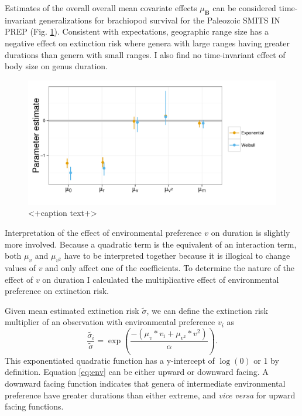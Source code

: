 \documentclass[12pt,letterpaper]{article}
\begin{document}
Estimates of the overall overall mean covariate effects \(\mu_{\mathbf{B}}\) can be considered time-invariant generalizations for brachiopod survival for the Paleozoic \uppercase{Smits in prep} (Fig. \ref{fig:mu}). Consistent with expectations, geographic range size has a negative effect on extinction risk where genera with large ranges having greater durations than genera with small ranges. I also find no time-invariant effect of body size on genus duration. 
\begin{figure}[ht]
  \centering
  \includegraphics[height = 0.5\textheight,width=\textwidth,keepaspectratio=true]{figure/coef_means}
  \caption{<+caption text+>}
  \label{fig:mu}
\end{figure}

Interpretation of the effect of environmental preference \(v\) on duration is slightly more involved. Because a quadratic term is the equivalent of an interaction term, both \(\mu_{v}\) and \(\mu_{v^{2}}\) have to be interpreted together because it is illogical to change values of \(v\) and only affect one of the coefficients. To determine the nature of the effect of \(v\) on duration I calculated the multiplicative effect of environmental preference on extinction risk.

Given mean estimated extinction risk \(\tilde{\sigma}\), we can define the extinction risk multiplier of an observation with environmental preference \(v_{i}\) as 
\begin{equation}
  \frac{\tilde{\sigma_{i}}}{\tilde{\sigma}} = \exp\left(\frac{-(\mu_{v} * v_{i} + \mu_{v^{2}} * v^{2})}{\alpha}\right).
  \label{eq:env}
\end{equation}
This exponentiated quadratic function has a y-intercept of \(\log(0)\) or 1 by definition. Equation \ref{eq:env} can be either upward or downward facing. A downward facing function indicates that genera of intermediate environmental preference have greater durations than either extreme, and \textit{vice versa} for upward facing functions.
\end{document}
